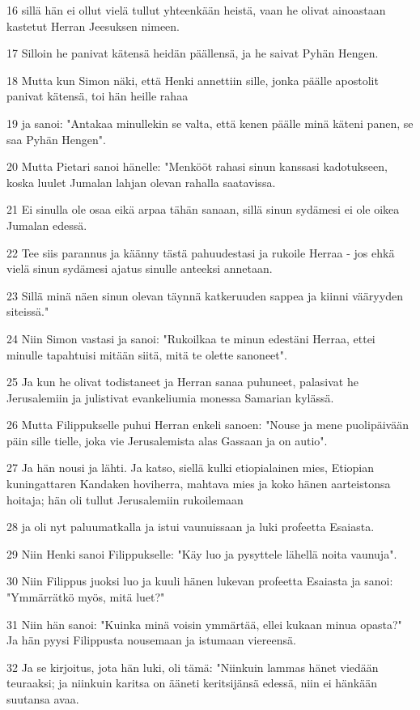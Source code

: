 \par 16 sillä hän ei ollut vielä tullut yhteenkään heistä, vaan he olivat ainoastaan kastetut Herran Jeesuksen nimeen.
\par 17 Silloin he panivat kätensä heidän päällensä, ja he saivat Pyhän Hengen.
\par 18 Mutta kun Simon näki, että Henki annettiin sille, jonka päälle apostolit panivat kätensä, toi hän heille rahaa
\par 19 ja sanoi: "Antakaa minullekin se valta, että kenen päälle minä käteni panen, se saa Pyhän Hengen".
\par 20 Mutta Pietari sanoi hänelle: "Menkööt rahasi sinun kanssasi kadotukseen, koska luulet Jumalan lahjan olevan rahalla saatavissa.
\par 21 Ei sinulla ole osaa eikä arpaa tähän sanaan, sillä sinun sydämesi ei ole oikea Jumalan edessä.
\par 22 Tee siis parannus ja käänny tästä pahuudestasi ja rukoile Herraa - jos ehkä vielä sinun sydämesi ajatus sinulle anteeksi annetaan.
\par 23 Sillä minä näen sinun olevan täynnä katkeruuden sappea ja kiinni vääryyden siteissä."
\par 24 Niin Simon vastasi ja sanoi: "Rukoilkaa te minun edestäni Herraa, ettei minulle tapahtuisi mitään siitä, mitä te olette sanoneet".
\par 25 Ja kun he olivat todistaneet ja Herran sanaa puhuneet, palasivat he Jerusalemiin ja julistivat evankeliumia monessa Samarian kylässä.
\par 26 Mutta Filippukselle puhui Herran enkeli sanoen: "Nouse ja mene puolipäivään päin sille tielle, joka vie Jerusalemista alas Gassaan ja on autio".
\par 27 Ja hän nousi ja lähti. Ja katso, siellä kulki etiopialainen mies, Etiopian kuningattaren Kandaken hoviherra, mahtava mies ja koko hänen aarteistonsa hoitaja; hän oli tullut Jerusalemiin rukoilemaan
\par 28 ja oli nyt paluumatkalla ja istui vaunuissaan ja luki profeetta Esaiasta.
\par 29 Niin Henki sanoi Filippukselle: "Käy luo ja pysyttele lähellä noita vaunuja".
\par 30 Niin Filippus juoksi luo ja kuuli hänen lukevan profeetta Esaiasta ja sanoi: "Ymmärrätkö myös, mitä luet?"
\par 31 Niin hän sanoi: "Kuinka minä voisin ymmärtää, ellei kukaan minua opasta?" Ja hän pyysi Filippusta nousemaan ja istumaan viereensä.
\par 32 Ja se kirjoitus, jota hän luki, oli tämä: "Niinkuin lammas hänet viedään teuraaksi; ja niinkuin karitsa on ääneti keritsijänsä edessä, niin ei hänkään suutansa avaa.
